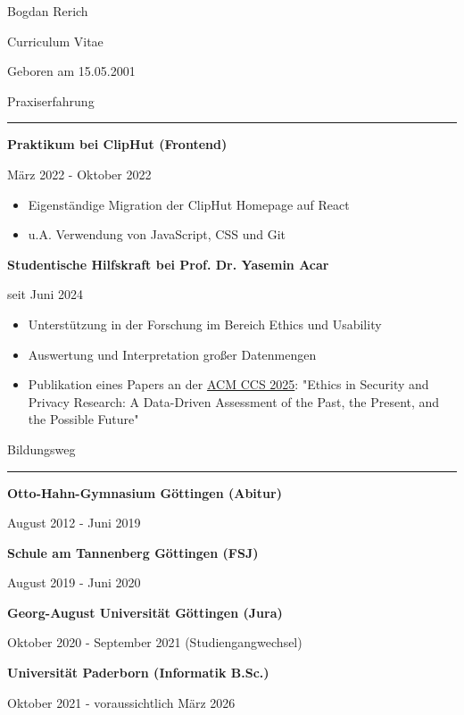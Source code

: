 \documentclass{letter}
\begin{document}
\begin{minipage}[t]{0.60\textwidth}
\setlength{\baselineskip}{1.5\baselineskip}
\vspace{0.8cm}
{\huge Bogdan Rerich}

{\large Curriculum Vitae}

\vspace{0.5cm}
 
Geboren am 15.05.2001

\vspace{0.5cm}

{\large Praxiserfahrung}
\rule{\linewidth}{0.4pt}

{\large \textbf{Praktikum bei ClipHut (Frontend)}}

{\small März 2022 - Oktober 2022}

\begin{itemize}
    \item Eigenständige Migration der ClipHut Homepage auf React
    \item u.A. Verwendung von JavaScript, CSS und Git
\end{itemize}

{\large \textbf{Studentische Hilfskraft bei Prof. Dr. Yasemin Acar}}

{\small seit Juni 2024}

\begin{itemize}
    \item Unterstützung in der Forschung im Bereich Ethics und Usability
    \item Auswertung und Interpretation großer Datenmengen 
    \item Publikation eines Papers an der \href{https://www.sigsac.org/ccs/CCS2025/accepted-papers/}{ACM CCS 2025}: "Ethics in Security and Privacy Research: A Data-Driven Assessment of the Past, the Present, and the Possible Future"
\end{itemize}


{\large Bildungsweg}
\rule{\linewidth}{0.4pt}

{\large \textbf{Otto-Hahn-Gymnasium Göttingen (Abitur)}}

{\small August 2012 - Juni 2019}

{\large \textbf{Schule am Tannenberg Göttingen (FSJ)}}

{\small August 2019 - Juni 2020}

{\large \textbf{Georg-August Universität Göttingen (Jura)}}

{\small Oktober 2020 - September 2021 (Studiengangwechsel)}

{\large \textbf{Universität Paderborn (Informatik B.Sc.)}}

{\small Oktober 2021 - voraussichtlich März 2026}

\end{minipage}
\end{document}
